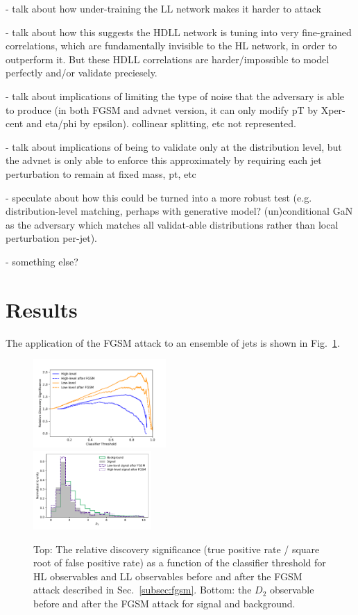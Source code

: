 \documentclass[reprint,nofootinbib,...]{revtex4-1}
\begin{document}
- talk about how under-training the LL network makes it harder to attack

- talk about how this suggests the HDLL network is tuning into very fine-grained correlations, which are fundamentally invisible to the HL network, in order to outperform it. But these HDLL correlations are harder/impossible to model perfectly and/or validate preciesely.

- talk about implications of limiting the type of noise that the adversary is able to produce (in both FGSM and advnet version, it can only modify pT by Xper-cent and eta/phi by epsilon). collinear splitting, etc not represented.

- talk about implications of being to validate only at the distribution level, but the advnet is only able to enforce this approximately by requiring each jet perturbation to remain at fixed mass, pt, etc

- speculate about how this could be turned into a more robust test (e.g. distribution-level matching, perhaps with generative model? (un)conditional GaN as the adversary which matches all validat-able distributions rather than local perturbation per-jet).

- something else?

\section{Results}

The application of the FGSM attack to an ensemble of jets is shown in Fig.~\ref{fig:FGSM2}.  

\begin{figure}[h!]
\centering
\includegraphics[width=0.45\textwidth]{figures/FGSM_Significance.pdf}\\
\includegraphics[width=0.4\textwidth]{figures/FGSM_D2.pdf}
\caption{Top: The relative discovery significance (true positive rate / square root of false positive rate) as a function of the classifier threshold for HL observables and LL observables before and after the FGSM attack described in Sec.~\ref{subsec:fgsm}.  Bottom: the $D_2$ observable before and after the FGSM attack for signal and background. }
\label{fig:FGSM2}
\end{figure}
\end{document}
